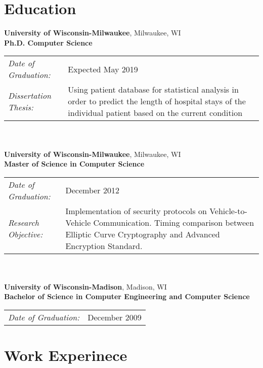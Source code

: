 \documentclass[11pt]{article}
\begin{document}
\section{Education}
\vspace{1em}
\noindent \textbf{University of Wisconsin-Milwaukee}, Milwaukee, WI\\
\indent \textbf{Ph.D. Computer Science} \\
\indent \begin{tabular}{l p{11cm}}
\textit{Date of Graduation:}    & Expected May 2019\\
\textit{Dissertation Thesis:} & Using patient database for statistical analysis 
                                in order to predict the length of hospital stays of the 
                                individual patient based on the current condition\\
\end{tabular}
\\\\
\noindent \textbf{University of Wisconsin-Milwaukee}, Milwaukee, WI\\
\indent \textbf{Master of Science in Computer Science} \\
\indent \begin{tabular}{l p{11cm}}
\textit{Date of Graduation:} & December 2012\\
\textit{Research Objective:} & Implementation of security protocols on Vehicle-to-Vehicle Communication. Timing comparison between Elliptic Curve Cryptography and Advanced Encryption Standard. \\
\end{tabular}
\\\\
\noindent \textbf{University of Wisconsin-Madison}, Madison, WI\\
\indent \textbf{Bachelor of Science in Computer Engineering and Computer Science} \\
\indent \begin{tabular}{l p{11cm}}
\textit{Date of Graduation:} & December 2009\\
\end{tabular}

\section{Work Experinece}
\end{document}

